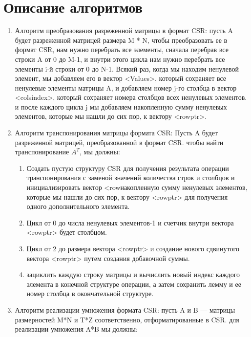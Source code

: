 \documentclass{report}
\begin{document}
\section*{Описание алгоритмов}
\begin{enumerate}
\item Алгоритм преобразования разреженной матрицы в формат CSR: 
\newline пусть A будет разреженной матрицей размера M * N, чтобы преобразовать ее в формат CSR, нам нужно перебрать все элементы, сначала перебрав все строки A от 0 до M-1, и внутри этого цикла нам нужно перебрать все элементы i-й строки от 0 до N-1. Всякий раз, когда мы находим ненулевой элемент, мы добавляем его в вектор <Values>, который сохраняет все ненулевые элементы матрицы A, и добавляем номер j-го столбца в вектор <cols\textunderscore index>, который сохраняет номера столбцов всех ненулевых элементов. и после каждого цикла j мы добавляем накопленную сумму ненулевых элементов, которые мы нашли до сих пор, к вектору <row\textunderscore ptr>.
\item Алгоритм транспонирования матрицы формата CSR:
Пусть A будет разреженной матрицей, преобразованной в формат CSR. чтобы найти транспонирование $A^{T}$, мы должны:
\begin{enumerate}
\item Создать пустую структуру CSR для получения результата операции транспонирования с заменой значений количества строк и столбцов и инициализировать вектор <rowнакопленную сумму ненулевых элементов, которые мы нашли до сих пор, к вектору <row\textunderscore ptr> для получения одного дополнительного элемента.
\item Цикл от 0 до числа ненулевых элементов-1 и счетчик внутри вектора <row\textunderscore ptr> будет столбцом.
\item Цикл от 2 до размера вектора <row\textunderscore ptr> и создание нового сдвинутого вектора <row\textunderscore ptr> путем создания добавочной суммы.
\item зациклить каждую строку матрицы и вычислить новый индекс каждого элемента в конечной структуре операции, а затем сохранить лемму и ее номер столбца в окончательной структуре.
\end{enumerate}
\item Алгоритм реализации умножения формата CSR:
\newline пусть A и B — матрицы размерностей M*N и T*Z соответственно, отформатированные в CSR. для реализации умножения A*B мы должны:

\end{enumerate}
\end{document}
